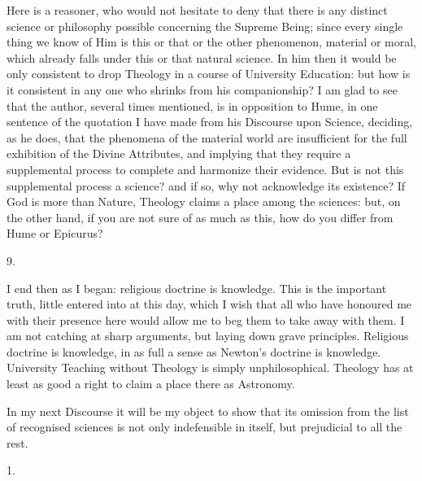 Here is a reasoner, who would not hesitate to deny that there is
any distinct science or philosophy possible concerning the Supreme
Being; since every single thing we know of Him is this or that or the
other phenomenon, material or moral, which already falls under this or
that natural science. In him then it would be only consistent to drop
Theology in a course of University Education: but how is it consistent
in any one who shrinks from his companionship? I am glad to see that
the author, several times mentioned, is in opposition to Hume, in one
sentence of the quotation I have made from his Discourse upon Science,
deciding, as he does, that the phenomena of the material world are
insufficient for the full exhibition of the Divine Attributes, and
implying that they require a supplemental process to complete and
harmonize their evidence. But is not this supplemental process a
science? and if so, why not acknowledge its existence? If God is more
than Nature, Theology claims a place among the sciences: but, on the
other hand, if you are not sure of as much as this, how do you differ
from Hume or Epicurus?

9.

I end then as I began: religious doctrine is knowledge. This
is the important truth, little entered into at this day, which I wish
that all who have honoured me with their presence here would allow me
to beg them to take away with them. I am not catching at sharp
arguments, but laying down grave principles. Religious doctrine is
knowledge, in as full a sense as Newton's doctrine is knowledge.
University Teaching without Theology is simply unphilosophical.
Theology has at least as good a right to claim a place there as
Astronomy.

In my next Discourse it will be my object to show that its omission
from the list of recognised sciences is not only indefensible in
itself, but prejudicial to all the rest.


1.

